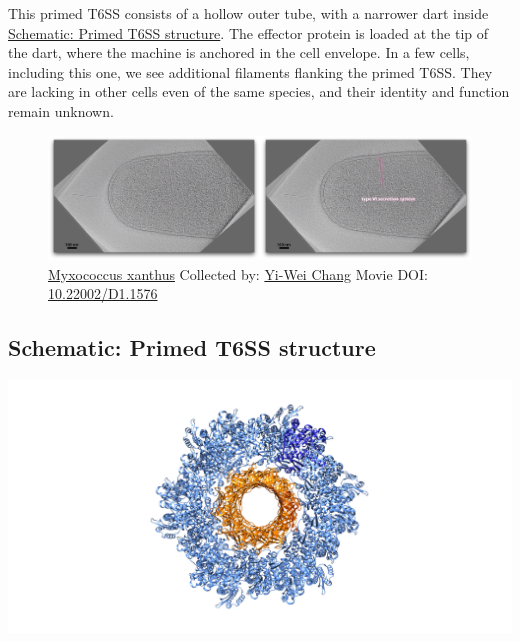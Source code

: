 \documentclass[]{tufte-book}
\begin{document}
This primed T6SS consists of a hollow outer tube, with a narrower dart
inside \protect\hyperlink{Primed_T6SS_structure}{Schematic: Primed T6SS
structure}. The effector protein is loaded at the tip of the dart, where
the machine is anchored in the cell envelope. In a few cells, including
this one, we see additional filaments flanking the primed T6SS. They are
lacking in other cells even of the same species, and their identity and
function remain unknown.





\begin{figure}
\includegraphics{movie_stills/9_6} \caption[\protect\hyperlink{tree}{Myxococcus xanthus} Collected by:
\protect\hyperlink{yi-wei_chang}{Yi-Wei Chang} Movie DOI:
\href{https://doi.org/10.22002/D1.1576}{10.22002/D1.1576}]{\protect\hyperlink{tree}{Myxococcus xanthus} Collected by:
\protect\hyperlink{yi-wei_chang}{Yi-Wei Chang} Movie DOI:
\href{https://doi.org/10.22002/D1.1576}{10.22002/D1.1576}}\label{fig:9-6}
\end{figure}

\hypertarget{Primed_T6SS_structure}{\subsection*{Schematic: Primed T6SS
structure}\label{Primed_T6SS_structure}}

\includegraphics{img/schematics/9_6_1}
\end{document}
